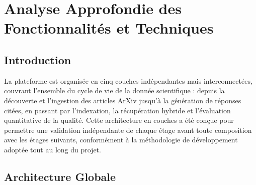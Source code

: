 \chapter{Analyse Approfondie des Fonctionnalités et Techniques}

\section*{Introduction}

La plateforme est organisée en cinq couches indépendantes mais interconnectées, couvrant
l'ensemble du cycle de vie de la donnée scientifique : depuis la découverte et l'ingestion
des articles ArXiv jusqu'à la génération de réponses citées, en passant par l'indexation,
la récupération hybride et l'évaluation quantitative de la qualité. Cette architecture
en couches a été conçue pour permettre une validation indépendante de chaque étage avant
toute composition avec les étages suivants, conformément à la méthodologie de développement
adoptée tout au long du projet.

\usetikzlibrary{positioning, arrows.meta}

\section{Architecture Globale}

